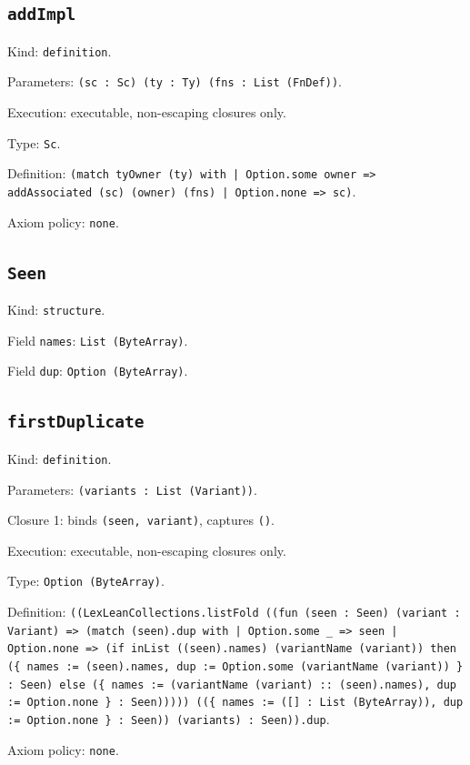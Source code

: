 \documentclass[11pt]{article}
\begin{document}
\subsection*{\texttt{addImpl}}
\noindent Kind: \texttt{definition}.\par
\noindent Parameters: \texttt{(sc : Sc) (ty : Ty) (fns : List (FnDef))}.\par
\noindent Execution: executable, non-escaping closures only.\par
\noindent Type: \texttt{Sc}.\par
\noindent Definition: \texttt{(match tyOwner (ty) with | Option.some owner => addAssociated (sc) (owner) (fns) | Option.none => sc)}.\par
\noindent Axiom policy: \texttt{none}.\par
\subsection*{\texttt{Seen}}
\noindent Kind: \texttt{structure}.\par
\noindent Field \texttt{names}: \texttt{List (ByteArray)}.\par
\noindent Field \texttt{dup}: \texttt{Option (ByteArray)}.\par
\subsection*{\texttt{firstDuplicate}}
\noindent Kind: \texttt{definition}.\par
\noindent Parameters: \texttt{(variants : List (Variant))}.\par
\noindent Closure 1: binds \texttt{(seen, variant)}, captures \texttt{()}.\par
\noindent Execution: executable, non-escaping closures only.\par
\noindent Type: \texttt{Option (ByteArray)}.\par
\noindent Definition: \texttt{((LexLeanCollections.listFold ((fun (seen : Seen) (variant : Variant) => (match (seen).dup with | Option.some \_ => seen | Option.none => (if inList ((seen).names) (variantName (variant)) then (\{ names := (seen).names, dup := Option.some (variantName (variant)) \} : Seen) else (\{ names := (variantName (variant) :: (seen).names), dup := Option.none \} : Seen))))) ((\{ names := ([] : List (ByteArray)), dup := Option.none \} : Seen)) (variants) : Seen)).dup}.\par
\noindent Axiom policy: \texttt{none}.\par
\end{document}
